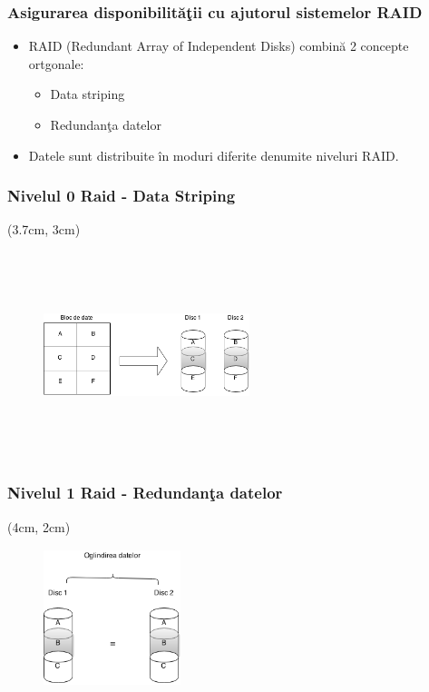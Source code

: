 \documentclass{beamer}
\theoremstyle{definition}
\begin{document}
\begin{frame}
    \frametitle{Asigurarea disponibilit\u{a}\c{t}ii cu ajutorul sistemelor RAID}
    \begin{itemize}
        \item RAID (Redundant Array of Independent Disks) combin\u{a} 2 concepte ortgonale:
        \pause
            \begin{itemize}
                \item Data striping
                \pause
                \item Redundan\c{t}a datelor 
            \end{itemize}
        \pause
        \item Datele sunt distribuite \^{i}n moduri diferite denumite niveluri RAID.
    \end{itemize}
\end{frame}
\begin{frame}
    \frametitle{Nivelul 0 Raid - Data Striping}
    \begin{textblock*}{4cm}(3.7cm, 3cm)
        \begin{figure}
            \includegraphics[width=6cm,height=6cm,keepaspectratio]{img/raid/raid0.png}
       \end{figure}
    \end{textblock*}  
\end{frame}

\begin{frame}
    \frametitle{Nivelul 1 Raid - Redundan\c{t}a datelor}
    \begin{textblock*}{4cm}(4cm, 2cm)
        \begin{figure}
            \includegraphics[width=4cm,height=4cm,keepaspectratio]{img/raid/raid1.png}

            \caption{}
       \end{figure}
    \end{textblock*}  
\end{frame}
\end{document}
